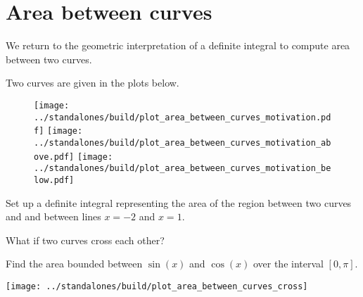 \documentclass[../main.tex]{subfiles}
\begin{document}
 \section{Area between curves}
  We return to the geometric interpretation of a definite integral to compute area between two curves.

  \begin{example}
    Two curves are given in the plots below. 
    \begin{figure}[H]
      \centering
      \texttt{[image: ../standalones/build/plot\_area\_between\_curves\_motivation.pdf]}
      \hspace{1em}
      \texttt{[image: ../standalones/build/plot\_area\_between\_curves\_motivation\_above.pdf]}
      \hspace{2em}
      \texttt{[image: ../standalones/build/plot\_area\_between\_curves\_motivation\_below.pdf]}
    \end{figure}

    Set up a definite integral representing the area of the region between two curves  and  and between lines \(x = -2\) and \(x = 1\).


  \end{example}

  What if two curves cross each other?
  \begin{example}
    Find the area bounded between \(\sin(x)\) and \(\cos(x)\) over the interval \([0, \pi]\).

    \texttt{[image: ../standalones/build/plot\_area\_between\_curves\_cross]}

  \end{example}
  \clearpage
\end{document}
